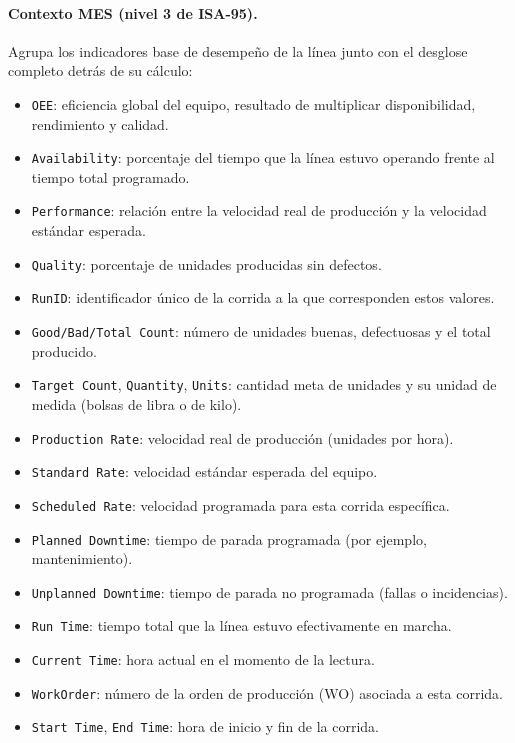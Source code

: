 \paragraph{Contexto MES (nivel 3 de ISA-95).} Agrupa los indicadores base de desempeño de la línea junto con el desglose completo detrás de su cálculo:
\begin{itemize}
    \item \texttt{OEE}: eficiencia global del equipo, resultado de multiplicar disponibilidad, rendimiento y calidad.
    \item \texttt{Availability}: porcentaje del tiempo que la línea estuvo operando frente al tiempo total programado.
    \item \texttt{Performance}: relación entre la velocidad real de producción y la velocidad estándar esperada.
    \item \texttt{Quality}: porcentaje de unidades producidas sin defectos.
    \item \texttt{RunID}: identificador único de la corrida a la que corresponden estos valores.
    \item \texttt{Good/Bad/Total Count}: número de unidades buenas, defectuosas y el total producido.
    \item \texttt{Target Count}, \texttt{Quantity}, \texttt{Units}: cantidad meta de unidades y su unidad de medida (bolsas de libra o de kilo).
    \item \texttt{Production Rate}: velocidad real de producción (unidades por hora).
    \item \texttt{Standard Rate}: velocidad estándar esperada del equipo.
    \item \texttt{Scheduled Rate}: velocidad programada para esta corrida específica.
    \item \texttt{Planned Downtime}: tiempo de parada programada (por ejemplo, mantenimiento).
    \item \texttt{Unplanned Downtime}: tiempo de parada no programada (fallas o incidencias).
    \item \texttt{Run Time}: tiempo total que la línea estuvo efectivamente en marcha.
    \item \texttt{Current Time}: hora actual en el momento de la lectura.
    \item \texttt{WorkOrder}: número de la orden de producción (WO) asociada a esta corrida.
    \item \texttt{Start Time}, \texttt{End Time}: hora de inicio y fin de la corrida.
\end{itemize}

